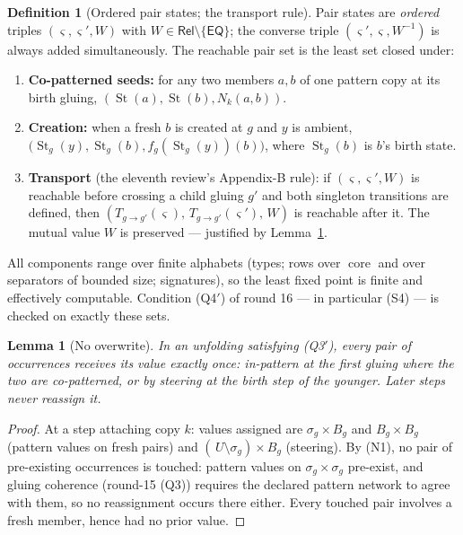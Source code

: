 \documentclass[11pt]{article}
\newtheorem{lemma}[theorem]{Lemma}
\theoremstyle{definition}
\newtheorem{definition}[theorem]{Definition}
\newcommand{\EQ}{\mathsf{EQ}}
\newcommand{\Rel}{\mathsf{Rel}}
\newcommand{\St}{\operatorname{St}}
\newcommand{\core}{\operatorname{core}}
\begin{document}
\begin{definition}[Ordered pair states; the transport rule]\label{def:pairs}
Pair states are \emph{ordered} triples $(\varsigma,\varsigma',W)$ with
$W\in\Rel\setminus\{\EQ\}$; the converse triple
$(\varsigma',\varsigma,W^{-1})$ is always added simultaneously.  The
reachable pair set is the least set closed under:
\begin{enumerate}[label=(P\arabic*),leftmargin=2.6em]
\item \textbf{Co-patterned seeds:} for any two members $a,b$ of one
pattern copy at its birth gluing, $(\St(a),\St(b),N_k(a,b))$.
\item \textbf{Creation:} when a fresh $b$ is created at $g$ and $y$ is
ambient, $\bigl(\St_g(y),\St_g(b),f_g(\St_g(y))(b)\bigr)$, where
$\St_g(b)$ is $b$'s birth state.
\item \textbf{Transport} (the eleventh review's Appendix-B rule): if
$(\varsigma,\varsigma',W)$ is reachable before crossing a child gluing
$g'$ and both singleton transitions are defined, then
$(T_{g\to g'}(\varsigma),\,T_{g\to g'}(\varsigma'),\,W)$ is reachable
after it.  The mutual value $W$ is preserved --- justified by
Lemma~\ref{lem:noover}.
\end{enumerate}
All components range over finite alphabets (types; rows over
$\core$ and over separators of bounded size; signatures), so the least
fixed point is finite and effectively computable.  Condition (Q4$'$) of
round 16 --- in particular (S4) --- is checked on exactly these sets.
\end{definition}

\begin{lemma}[No overwrite]\label{lem:noover}
In an unfolding satisfying (Q3$'$), every pair of occurrences receives
its value exactly once: in-pattern at the first gluing where the two
are co-patterned, or by steering at the birth step of the younger.
Later steps never reassign it.
\end{lemma}

\begin{proof}
At a step attaching copy $k$: values assigned are $\sigma_g\times B_g$
and $B_g\times B_g$ (pattern values on fresh pairs) and
$(\,U\setminus\sigma_g)\times B_g$ (steering).  By (N1), no pair of
pre-existing occurrences is touched: pattern values on
$\sigma_g\times\sigma_g$ pre-exist, and gluing coherence (round-15
(Q3)) requires the declared pattern network to agree with them, so no
reassignment occurs there either.  Every touched pair involves a fresh
member, hence had no prior value.
\end{proof}
\end{document}
